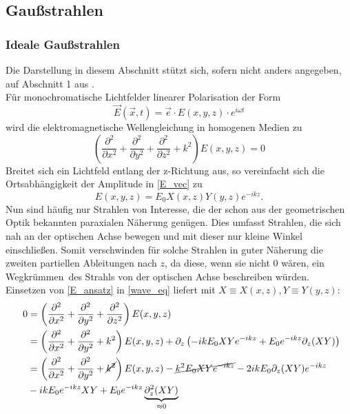 \documentclass[11pt,a4paper,oneside]{scrartcl}
\begin{document}
\subsection{Gaußstrahlen}
\subsubsection{Ideale Gaußstrahlen}
Die Darstellung in diesem Abschnitt stützt sich, sofern nicht anders angegeben, auf Abschnitt 1 aus \cite{versuchsanleitung}. \\
Für monochromatische Lichtfelder linearer Polarisation der Form 
\begin{equation}\label{E_vec}
\vec E(\vec x,t)=\vec e\cdot E(x,y,z)\cdot e^{i\omega t}
\end{equation}
wird die elektromagnetische Wellengleichung in homogenen Medien zu
\begin{equation}\label{wave_eq}
\left(\frac{\partial^2}{\partial x^2}+\frac{\partial^2}{\partial y^2}+\frac{\partial^2}{\partial z^2}+k^2\right)E(x,y,z)=0
\end{equation}
Breitet sich ein Lichtfeld entlang der z-Richtung aus, so vereinfacht sich die Ortsabhängigkeit der Amplitude in \ref{E_vec} zu 
\begin{equation}\label{E_ansatz}
E(x,y,z)=E_0X(x,z)Y(y,z)e^{-ikz}.
\end{equation}
Nun sind häufig nur Strahlen von Interesse, die der schon aus der geometrischen Optik bekannten paraxialen Näherung genügen. Dies umfasst Strahlen, die sich nah an der optischen Achse bewegen und mit dieser nur kleine Winkel einschließen. Somit verschwinden für solche Strahlen in guter Näherung die zweiten partiellen Ableitungen nach $z$, da diese, wenn sie nicht $0$ wären, ein \glqq Wegkrümmen\grqq\ des Strahls von der optischen Achse beschreiben würden.\\
Einsetzen von \ref{E_ansatz} in \ref{wave_eq} liefert mit $X\equiv X(x,z), Y\equiv Y(y,z)$:
\begin{align}
0&=\left(\frac{\partial^2}{\partial x^2}+\frac{\partial^2}{\partial y^2}+\frac{\partial^2}{\partial z^2}\right)E(x,y,z) \\ \quad&
=\left(\frac{\partial^2}{\partial x^2}+\frac{\partial^2}{\partial y^2}+k^2\right)E(x,y,z)+\partial_z\left(-ikE_0XYe^{-ikz}+E_0e^{-ikz}\partial_z(XY)\right) \\ \quad&
=\left(\frac{\partial^2}{\partial x^2}+\frac{\partial^2}{\partial y^2}+\cancel{k^2}\right)E(x,y,z)-\cancel{k^2E_0XYe^{-ikz}}-2ikE_0\partial_z(XY)e^{-ikz}\\ \quad& -ikE_0e^{-ikz}XY+E_0e^{-ikz}\underbrace{\partial_z^2(XY)}_{\approx 0}
\end{align}
\end{document}

